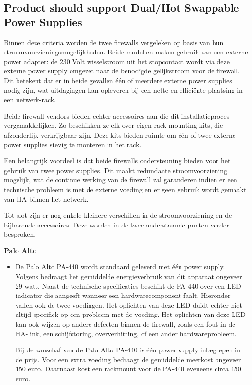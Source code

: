 \subsection{Product should support Dual/Hot Swappable Power Supplies}

Binnen deze criteria worden de twee firewalls vergeleken op basis van hun stroomvoorzieningsmogelijkheden. Beide modellen maken gebruik van een externe power adapter: de 230 Volt wisselstroom uit het stopcontact wordt via deze externe power supply omgezet naar de benodigde gelijkstroom voor de firewall. Dit betekent dat er in beide gevallen één of meerdere externe power supplies nodig zijn, wat uitdagingen kan opleveren bij een nette en efficiënte plaatsing in een netwerk-rack.

Beide firewall vendors bieden echter accessoires aan die dit installatieproces vergemakkelijken. Zo beschikken ze elk over eigen rack mounting kits, die afzonderlijk verkrijgbaar zijn. Deze kits bieden ruimte om één of twee externe power supplies stevig te monteren in het rack.

Een belangrijk voordeel is dat beide firewalls ondersteuning bieden voor het gebruik van twee power supplies. Dit maakt redundante stroomvoorziening mogelijk, wat de continue werking van de firewall zal garanderen indien er een technische probleem is met de externe voeding en er geen gebruik wordt gemaakt van HA binnen het netwerk.

Tot slot zijn er nog enkele kleinere verschillen in de stroomvoorziening en de bijhorende accessoires. Deze worden in de twee onderstaande punten verder besproken.

\textbf{Palo Alto}
\begin{itemize}[label=\textbullet]
    \item De Palo Alto PA-440 wordt standaard geleverd met één power supply. Volgens \textcite{PaloAltoHR2025} bedraagt het gemiddelde energieverbruik van dit apparaat ongeveer 29 watt. Naast de technische specificaties beschikt de PA-440 over een LED-indicator die aangeeft wanneer een hardwarecomponent faalt. Hieronder vallen ook de twee voedingen.
    Het oplichten van deze LED duidt echter niet altijd specifiek op een probleem met de voeding. Het oplichten van deze LED kan ook wijzen op andere defecten binnen de firewall, zoals een fout in de HA-link, een schijfstoring, oververhitting, of een ander hardwareprobleem.
    
    Bij de aanschaf van de Palo Alto PA-440 is één power supply inbegrepen in de prijs. Voor een extra voeding bedraagt de gemiddelde meerkost ongeveer 150 euro. Daarnaast kost een rackmount voor de PA-440 eveneens circa 150 euro.
\end{itemize}

